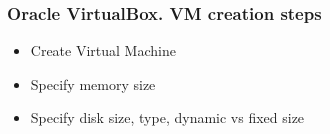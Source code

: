 \begin{frame}
\frametitle{Oracle VirtualBox. VM creation steps}
\begin{itemize}
    \item 
Create Virtual Machine
    \item 
Specify memory size
    \item 
Specify disk size, type, dynamic vs fixed size
\end{itemize}
\end{frame}
